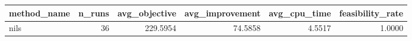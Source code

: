 \begin{tabular}{lrrrrr}
\toprule
method_name & n_runs & avg_objective & avg_improvement & avg_cpu_time & feasibility_rate \\
\midrule
nils & 36 & 229.5954 & 74.5858 & 4.5517 & 1.0000 \\
\bottomrule
\end{tabular}
